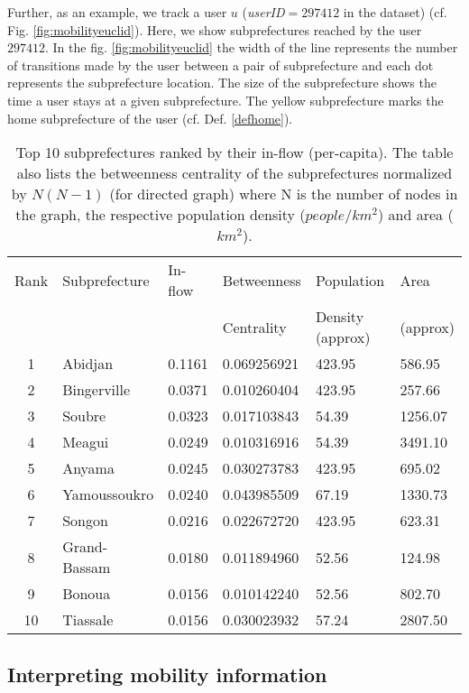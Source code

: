 \documentclass[review]{elsarticle}
\begin{document}
Further, as an example, we track a user $u$ (\emph{userID}$=297412$ in the dataset) (cf. Fig. \ref{fig:mobilityeuclid}). Here, we show subprefectures reached by the user $297412$. In the fig. \ref{fig:mobilityeuclid} the width of the line represents the number of transitions made by the user between a pair of subprefecture and each dot represents the subprefecture location. The size of the subprefecture shows the time a user stays at a given subprefecture. The yellow subprefecture marks the home subprefecture of the user (cf. Def. \ref{defhome}).

\begin{table}[!t]
\centering
\begin{tabular}{|c|l|l|l|l|l|}
\hline
{\footnotesize Rank} & {\footnotesize Subprefecture} & {\footnotesize In-flow} & {\footnotesize Betweenness} & {\footnotesize Population} & {\footnotesize Area} \\
& & & {\footnotesize Centrality} & {\footnotesize Density (approx)} & {\footnotesize (approx)}\\
\hline
1 & Abidjan & 0.1161 & 0.069256921 & 423.95 & 586.95\\
2 & Bingerville & 0.0371 & 0.010260404 & 423.95 & 257.66\\
3 & Soubre & 0.0323 & 0.017103843 & 54.39 & 1256.07\\
4 & Meagui & 0.0249 & 0.010316916 & 54.39 & 3491.10\\
5 & Anyama & 0.0245 & 0.030273783 & 423.95 & 695.02\\
6 & Yamoussoukro & 0.0240 & 0.043985509 & 67.19 & 1330.73\\
7 & Songon & 0.0216 & 0.022672720 & 423.95 & 623.31\\
8 & Grand-Bassam & 0.0180 & 0.011894960 & 52.56 & 124.98\\
9 & Bonoua & 0.0156 & 0.010142240 & 52.56 & 802.70\\
10 & Tiassale & 0.0156 & 0.030023932 & 57.24 & 2807.50\\
\hline
\end{tabular}
\caption{Top 10 subprefectures ranked by their in-flow (per-capita). The table also lists the betweenness centrality of the subprefectures normalized by $N(N-1)$ (for directed graph) where N is the number of nodes in the graph, the respective population density ($people/km^2$) and area ($km^2$).}
\label{table1}
\end{table}

\subsection{Interpreting mobility information}\label{subsec:Data set_2_and_3}
\end{document}
